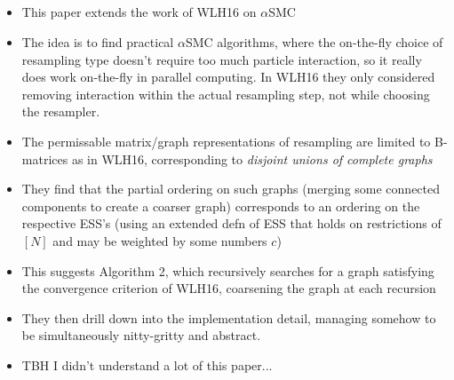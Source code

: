 \documentclass{article}
\begin{document}
\subsection*{\cite{lee2016}}
\begin{itemize}
\item This paper extends the work of WLH16 on $\alpha$SMC
\item The idea is to find practical $\alpha$SMC algorithms, where the on-the-fly choice of resampling type doesn't require too much particle interaction, so it really does work on-the-fly in parallel computing. In WLH16 they only considered removing interaction within the actual resampling step, not while choosing the resampler.
\item The permissable matrix/graph representations of resampling are limited to B-matrices as in WLH16, corresponding to \emph{disjoint unions of complete graphs}
\item They find that the partial ordering on such graphs (merging some connected components to create a coarser graph) corresponds to an ordering on the respective ESS's (using an extended defn of ESS that holds on restrictions of $[N]$ and may be weighted by some numbers $c$)
\item This suggests Algorithm 2, which recursively searches for a graph satisfying the convergence criterion of WLH16, coarsening the graph at each recursion
\item They then drill down into the implementation detail, managing somehow to be simultaneously nitty-gritty and abstract.
\item TBH I didn't understand a lot of this paper...
\end{itemize}
\end{document}
